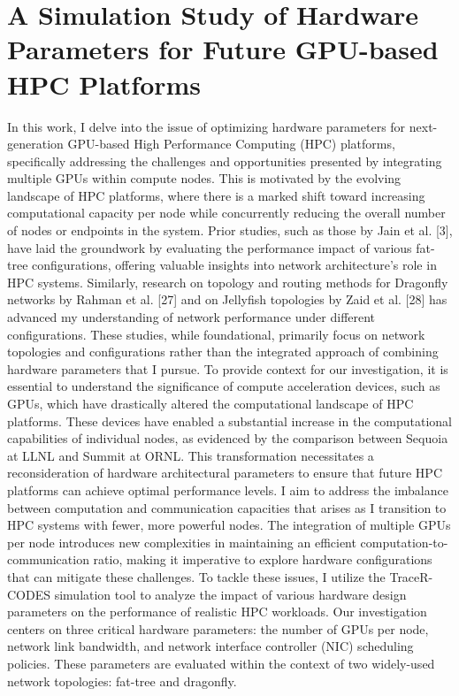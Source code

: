 \chapter{A Simulation Study of Hardware Parameters for Future GPU-based HPC Platforms}

 In this work, I delve into the issue of optimizing hardware parameters for next-generation GPU-based High Performance Computing (HPC) platforms, specifically addressing the challenges and opportunities presented by integrating multiple GPUs within compute nodes. This is motivated by the evolving landscape of HPC platforms, where there is a marked shift toward increasing computational capacity per node while concurrently reducing the overall number of nodes or endpoints in the system.
Prior studies, such as those by Jain et al. [3], have laid the groundwork by evaluating the performance impact of various fat-tree configurations, offering valuable insights into network architecture's role in HPC systems. Similarly, research on topology and routing methods for Dragonfly networks by Rahman et al. [27] and on Jellyfish topologies by Zaid et al. [28] has advanced my understanding of network performance under different configurations. These studies, while foundational, primarily focus on network topologies and configurations rather than the integrated approach of combining hardware parameters that I pursue.
To provide context for our investigation, it is essential to understand the significance of compute acceleration devices, such as GPUs, which have drastically altered the computational landscape of HPC platforms. These devices have enabled a substantial increase in the computational capabilities of individual nodes, as evidenced by the comparison between Sequoia at LLNL and Summit at ORNL. This transformation necessitates a reconsideration of hardware architectural parameters to ensure that future HPC platforms can achieve optimal performance levels.
I aim to address the imbalance between computation and communication capacities that arises as I transition to HPC systems with fewer, more powerful nodes. The integration of multiple GPUs per node introduces new complexities in maintaining an efficient computation-to-communication ratio, making it imperative to explore hardware configurations that can mitigate these challenges.
To tackle these issues, I utilize the TraceR-CODES simulation tool to analyze the impact of various hardware design parameters on the performance of realistic HPC workloads. Our investigation centers on three critical hardware parameters: the number of GPUs per node, network link bandwidth, and network interface controller (NIC) scheduling policies. These parameters are evaluated within the context of two widely-used network topologies: fat-tree and dragonfly.
